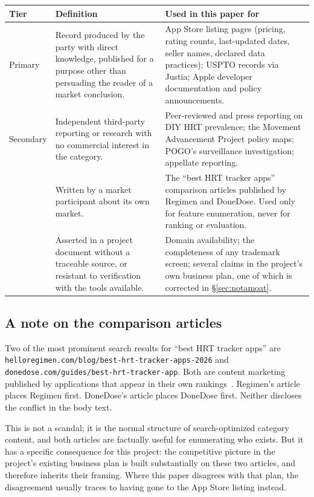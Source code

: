 \documentclass[11pt,a4paper]{article}
\newcommand{\bad}[1]{\obs{#1}}
\newcommand{\code}[1]{\texttt{\small #1}}
\begin{document}
\begin{longtable}{@{}L{2.6cm}L{5.4cm}L{7.2cm}@{}}
\toprule
\textbf{Tier} & \textbf{Definition} & \textbf{Used in this paper for} \\
\midrule
\endhead
Primary &
Record produced by the party with direct knowledge, published for a
purpose other than persuading the reader of a market conclusion. &
App Store listing pages (pricing, rating counts, last-updated dates,
seller names, declared data practices); USPTO records via Justia;
Apple developer documentation and policy announcements. \\[0.4em]

Secondary &
Independent third-party reporting or research with no commercial
interest in the category. &
Peer-reviewed and press reporting on DIY HRT prevalence; the Movement
Advancement Project policy maps; POGO's surveillance investigation;
appellate reporting. \\[0.4em]

\bad{Interested} &
Written by a market participant about its own market. &
The ``best HRT tracker apps'' comparison articles published by Regimen
and DoneDose. Used only for feature enumeration, never for ranking or
evaluation. \\[0.4em]

\bad{Unverified} &
Asserted in a project document without a traceable source, or resistant
to verification with the tools available. &
Domain availability; the completeness of any trademark screen; several
claims in the project's own business plan, one of which is corrected in
\S\ref{sec:notamoat}. \\
\bottomrule
\end{longtable}

\subsection{A note on the comparison articles}

Two of the most prominent search results for ``best HRT tracker apps''
are \code{helloregimen.com/blog/\allowbreak best-hrt-tracker-apps-2026}
and \code{donedose.com/guides/\allowbreak best-hrt-tracker-app}. Both are
content
marketing published by applications that appear in their own
rankings~\cite{regimenblog,donedoseblog}. Regimen's article places
Regimen first. DoneDose's article places DoneDose first. Neither
discloses the conflict in the body text.

This is not a scandal; it is the normal structure of search-optimized
category content, and both articles are factually useful for
enumerating who exists. But it has a specific consequence for this
project: the competitive picture in the project's existing business
plan is built substantially on these two articles, and therefore
inherits their framing. Where this paper disagrees with that plan, the
disagreement usually traces to having gone to the App Store listing
instead.
\end{document}

